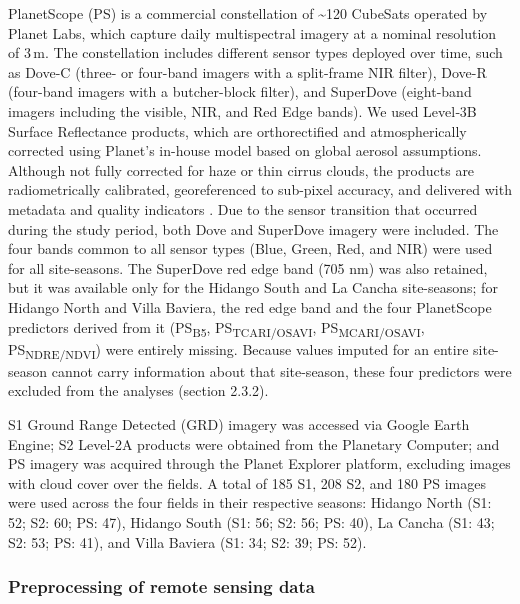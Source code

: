 \documentclass[
  british,
]{interact}
\begin{document}
PlanetScope (PS) is a commercial constellation of \textasciitilde120
CubeSats operated by Planet Labs, which capture daily multispectral
imagery at a nominal resolution of 3\,m. The constellation includes
different sensor types deployed over time, such as Dove-C (three- or
four-band imagers with a split-frame NIR filter), Dove-R (four-band
imagers with a butcher-block filter), and SuperDove (eight-band imagers
including the visible, NIR, and Red Edge bands). We used Level‑3B
Surface Reflectance products, which are orthorectified and
atmospherically corrected using Planet's in-house model based on global
aerosol assumptions. Although not fully corrected for haze or thin
cirrus clouds, the products are radiometrically calibrated,
georeferenced to sub-pixel accuracy, and delivered with metadata and
quality indicators \citep{Roy2021}. Due to the sensor transition that
occurred during the study period, both Dove and SuperDove imagery were
included. The four bands common to all sensor types (Blue, Green, Red,
and NIR) were used for all site-seasons. The SuperDove red edge band
(705 nm) was also retained, but it was available only for the Hidango
South and La Cancha site-seasons; for Hidango North and Villa Baviera,
the red edge band and the four PlanetScope predictors derived from it
(PS\textsubscript{B5}, PS\textsubscript{TCARI/OSAVI},
PS\textsubscript{MCARI/OSAVI}, PS\textsubscript{NDRE/NDVI}) were
entirely missing. Because values imputed for an entire site-season
cannot carry information about that site-season, these four predictors
were excluded from the analyses (section 2.3.2).

S1 Ground Range Detected (GRD) imagery was accessed via Google Earth
Engine; S2 Level-2A products were obtained from the Planetary Computer;
and PS imagery was acquired through the Planet Explorer platform,
excluding images with cloud cover over the fields. A total of 185 S1,
208 S2, and 180 PS images were used across the four fields in their
respective seasons: Hidango North (S1: 52; S2: 60; PS: 47), Hidango
South (S1: 56; S2: 56; PS: 40), La Cancha (S1: 43; S2: 53; PS: 41), and
Villa Baviera (S1: 34; S2: 39; PS: 52).

\subsubsection{Preprocessing of remote sensing
data}\label{preprocessing-of-remote-sensing-data}
\end{document}
